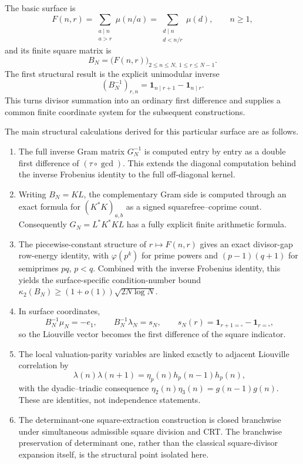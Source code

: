 \documentclass[11pt]{amsart}
\numberwithin{equation}{section}
\theoremstyle{plain}
\theoremstyle{definition}
\theoremstyle{remark}
\newcommand{\one}{\mathbf 1}
\newcommand{\mob}{\mu}
\newcommand{\liou}{\lambda}
\newcommand{\Fsurf}{F}
\begin{document}
The basic surface is
\begin{equation}
\Fsurf(n,r)=\sum_{\substack{a\mid n\\a>r}}\mob(n/a)
=\sum_{\substack{d\mid n\\d<n/r}}\mob(d),
\qquad n\ge1,
\label{eq:surface_small_divisors}
\end{equation}
and its finite square matrix is
\begin{equation}
B_N=\bigl(\Fsurf(n,r)\bigr)_{2\le n\le N,\ 1\le r\le N-1}.
\label{eq:BN_intro}
\end{equation}
The first structural result is the explicit unimodular inverse
\begin{equation}
(B_N^{-1})_{r,n}=\one_{n\mid r+1}-\one_{n\mid r}.
\label{eq:BN_inverse_intro}
\end{equation}
This turns divisor summation into an ordinary first difference and supplies a common finite coordinate system for the subsequent constructions.

The main structural calculations derived for this particular surface are as follows.
\begin{enumerate}[label=(\roman*)]
\item The full inverse Gram matrix $G_N^{-1}$ is computed entry by entry as a double first difference of $(\tau\circ\gcd)$.  This extends the diagonal computation behind the inverse Frobenius identity to the full off-diagonal kernel.
\item Writing $B_N=KL$, the complementary Gram side is computed through an exact formula for $(K^*K)_{a,b}$ as a signed squarefree--coprime count.  Consequently $G_N=L^*K^*KL$ has a fully explicit finite arithmetic formula.
\item The piecewise-constant structure of $r\mapsto F(n,r)$ gives an exact divisor-gap row-energy identity, with $\varphi(p^k)$ for prime powers and $(p-1)(q+1)$ for semiprimes $pq$, $p<q$.  Combined with the inverse Frobenius identity, this yields the surface-specific condition-number bound $\kappa_2(B_N)\ge(1+o(1))\sqrt{2N\log N}$.
\item In surface coordinates,
\begin{equation}
B_N^{-1}\mob_N=-e_1,
\qquad
B_N^{-1}\liou_N=s_N,
\qquad
s_N(r)=\one_{r+1=\square}-\one_{r=\square},
\label{eq:mu_lambda_coordinate_preview}
\end{equation}
so the Liouville vector becomes the first difference of the square indicator.
\item The local valuation-parity variables are linked exactly to adjacent Liouville correlation by
\begin{equation}
\liou(n)\liou(n+1)=\eta_p(n)h_p(n-1)h_p(n),
\label{eq:intro_eta_lambda_bridge}
\end{equation}
with the dyadic--triadic consequence $\eta_2(n)\eta_3(n)=g(n-1)g(n)$.  These are identities, not independence statements.
\item The determinant-one square-extraction construction is closed branchwise under simultaneous admissible square division and CRT.  The branchwise preservation of determinant one, rather than the classical square-divisor expansion itself, is the structural point isolated here.
\end{enumerate}
\end{document}
